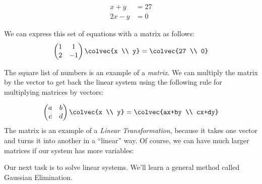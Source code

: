 \begin{align*}
	x+y & = 27 \\
	2x-y & = 0
\end{align*}

We can express this set of equations with a matrix as follows:
\begin{equation*}
    \begin{pmatrix}
      1             &1  \\
      2             &-1
    \end{pmatrix}
  \colvec{x \\ y}
  =
  \colvec{27 \\ 0}
\end{equation*}

The square list of numbers is an example of a \emph{matrix}.  We can multiply the matrix by the vector to get back the linear system using the following rule for multiplying matrices by vectors:

\begin{equation}\label{2x2multiplication}
    \begin{pmatrix}
      a             &b  \\
      c             &d
    \end{pmatrix}
  \colvec{x \\ y}
  =
  \colvec{ax+by \\ cx+dy}
\end{equation}
\noindent
The matrix is an example of a \emph{Linear Transformation}, because it takes one vector and turns it into another in a ``linear'' way.
Of course, we can have much larger matrices if our system has more variables:



Our next task is to solve linear systems. We'll learn a general method called Gaussian Elimination.








\newpage
